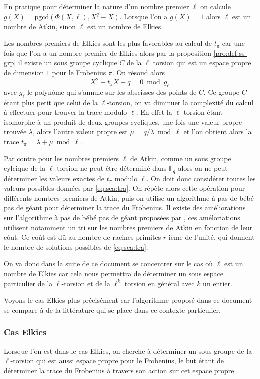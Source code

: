 \documentclass[10pt,a4paper]{book}
\theoremstyle{plain}
\theoremstyle{definition}
\theoremstyle{definition}
\theoremstyle{definition}
\theoremstyle{definition}
\theoremstyle{remark}
\theoremstyle{remark}
\begin{document}
En pratique pour déterminer la nature d'un nombre premier $\ell$ on calcule $g(X)=\mathrm{pgcd}(\Phi(X,\ell),X^q-X)$. Lorsque l'on a $g(X)=1$  alors $\ell$ est un nombre de Atkin, sinon $\ell$ est un nombre de Elkies.

Les nombres premiers de Elkies sont les plus favorables au calcul de $t_{\pi}$ car une fois que l'on a un nombre premier de Elkies alors par la proposition \ref{pro:def-ss-grp} il existe un sous groupe cyclique $C$ de la $\ell$ torsion qui est un espace propre de dimension $1$ pour le Frobenius $\pi$. On résoud alors 
\begin{equation*}
X^2-t_{\pi}X+q = 0 \bmod g_{\ell}
\end{equation*} 
avec $g_{\ell}$ le polynôme qui s'annule sur les abscisses des points de $C$.
Ce groupe $C$ étant plus petit que celui de la $\ell$-torsion, on va diminuer la complexité du calcul à effectuer pour trouver la trace modulo $\ell$. En effet la $\ell$-torsion étant isomorphe à un produit de deux groupes cycliques, une fois une valeur propre trouvée $\lambda$, alors l'autre valeur propre est $\mu=q/\lambda \bmod \ell$ et l'on obtient alors la trace $t_{\pi}=\lambda+\mu \bmod \ell$. 

Par contre pour les nombres premiers $\ell$ de Atkin, comme un sous groupe cylcique de la $\ell$-torsion ne peut être déterminé dans $\mathbb{F}_q$ alors on ne peut déterminer les valeurs exactes de $t_{\pi}$ modulo $\ell$. On doit donc considérer toutes les valeurs possibles données par \eqref{eq:sea:tra}. On répète alors cette opération pour  différents nombres premiers de Atkin, puis on utilise un algorithme à pas de bébé pas de géant pour déterminer la trace du Frobenius. Il existe des améliorations sur l'algorithme à pas de bébé pas de géant proposées par \cite{Ler97a}, ces améloriations utilisent notamment un tri sur les nombres premiers de Atkin en fonction de leur côut. Ce coût est dû au nombre de racines primites $r$-ième de l'unité, qui donnent le nombre de solutions possibles de \eqref{eq:sea:tra}.


On va donc dans la suite de ce document se concentrer sur le cas où $\ell$ est un nombre de Elkies car cela nous permettra de déterminer un sous espace particulier de la $\ell$-torsion et de la $\ell^k$ torsion en général avec $k$ un entier.

Voyons le cas Elkies plus précisément car l'algorithme proposé dans ce document se compare à de la littérature qui se place dans ce contexte particulier.

\subsubsection{Cas Elkies} \label{sub:Elkies}
Lorsque l'on est dans le cas Elkies, on cherche à déterminer un sous-groupe de la $\ell$-torsion qui est aussi espace propre pour le Frobenius, le but étant de déterminer la trace du Frobenius à travers son action sur cet espace propre. 
\end{document}
